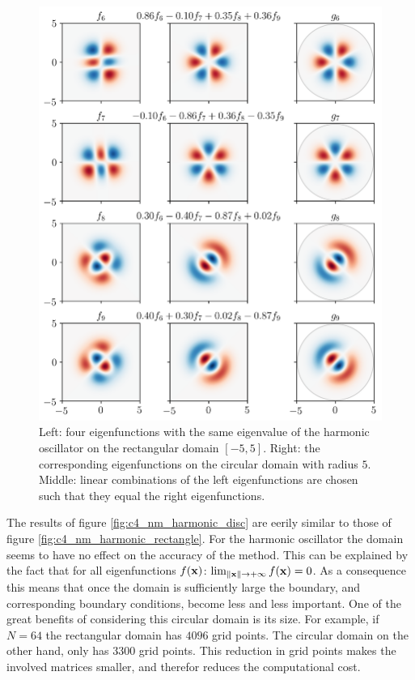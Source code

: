 \begin{figure}
    \begin{center}
        \includegraphics[width=\textwidth]{img/chapter4/nm_test_harmonic_eigenfunctions.png}
    \end{center}
    \caption{Left: four eigenfunctions with the same eigenvalue of the harmonic oscillator on the rectangular domain $[-5, 5]$. Right: the corresponding eigenfunctions on the circular domain with radius $5$. Middle: linear combinations of the left eigenfunctions are chosen such that they equal the right eigenfunctions.}
    \label{fig:c4_nm_harmonic_eigenfunctions}
\end{figure}

The results of figure \ref{fig:c4_nm_harmonic_disc} are eerily similar to those of figure \ref{fig:c4_nm_harmonic_rectangle}. For the harmonic oscillator the domain seems to have no effect on the accuracy of the method. This can be explained by the fact that for all eigenfunctions $f(\vb{x})$: $\lim_{\|\vb{x}\| \to +\infty} f(\vb{x}) = 0$. As a consequence this means that once the domain is sufficiently large the boundary, and corresponding boundary conditions, become less and less important. One of the great benefits of considering this circular domain is its size. For example, if $N = 64$ the rectangular domain has $4096$ grid points. The circular domain on the other hand, only has $3300$ grid points. This reduction in grid points makes the involved matrices smaller, and therefor reduces the computational cost.

